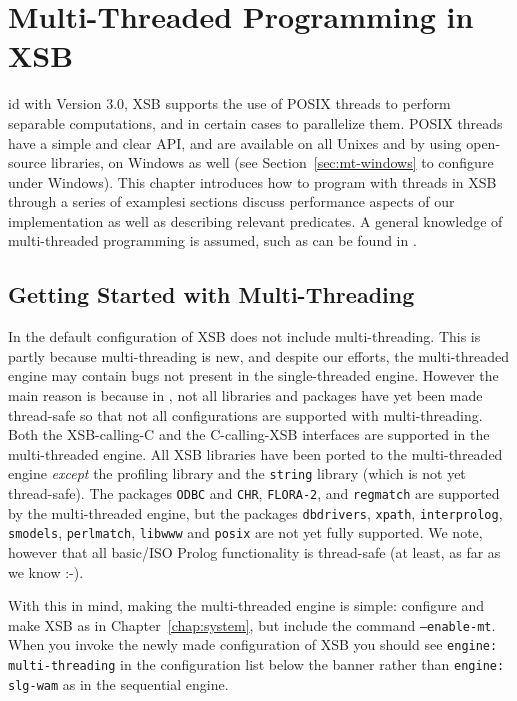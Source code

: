\chapter{Multi-Threaded Programming in XSB} \label{chap:threads}

id with Version 3.0, XSB supports the use of POSIX threads to
perform separable computations, and in certain cases to parallelize
them.  POSIX threads have a simple and clear API, and are available on
all Unixes and by using open-source libraries, on Windows as well (see
Section~\ref{sec:mt-windows} to configure under Windows).  This
chapter introduces how to program with threads in XSB through a series
of examplesi sections discuss performance aspects of our
implementation as well as describing relevant predicates.  A general
knowledge of multi-threaded programming is assumed, such as can be
found in \cite{LewB98,Bute97}.

\section{Getting Started with Multi-Threading}
%
In \version{} the default configuration of XSB does not include
multi-threading.  This is partly because multi-threading is new, and
despite our efforts, the multi-threaded engine may contain bugs not
present in the single-threaded engine.  However the main reason is
because in \version , not all libraries and packages have yet been
made thread-safe so that not all configurations are supported with
multi-threading.  Both the XSB-calling-C and the C-calling-XSB
interfaces are supported in the multi-threaded engine.  All XSB
libraries have been ported to the multi-threaded engine {\em except}
the profiling library and the {\tt string} library (which is not yet
thread-safe).  The packages {\tt ODBC} and {\tt CHR}, {\tt FLORA-2},
and {\tt regmatch} are supported by the multi-threaded engine, but the
packages {\tt dbdrivers}, {\tt xpath}, {\tt interprolog}, {\tt
  smodels}, {\tt perlmatch}, {\tt libwww} and {\tt posix} are not yet
fully supported.  We note, however that all basic/ISO Prolog
functionality is thread-safe (at least, as far as we know :-).

With this in mind, making the multi-threaded engine is simple:
configure and make XSB as in Chapter~\ref{chap:system}, but include
the command {\tt --enable-mt}.  When you invoke the newly made
configuration of XSB you should see {\tt engine: multi-threading} in
the configuration list below the banner rather than {\tt engine:
  slg-wam} as in the sequential engine.

